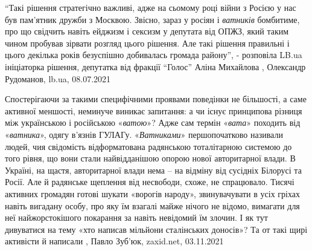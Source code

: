 \enquote{Такі рішення стратегічно важливі, адже на сьомому році війни з Росією у нас
був пам'ятник дружби з Москвою. Звісно, зараз у росіян і \emph{ватників} бомбитиме,
про що свідчить навіть ейджизм і сексизм у депутата від ОПЖЗ, який таким чином
пробував зірвати розгляд цього рішення. Але такі рішення правильні і цього
декілька років безуспішно добивалась громада району}, - розповіла LB.ua
ініціаторка рішення, депутатка від фракції \enquote{Голос} Аліна Михайлова
, 
Олександр Рудоманов, lb.ua, 08.07.2021

Спостерігаючи за такими специфічними проявами поведінки не більшості, а саме
активної меншості, неминуче виникає запитання: а чи існує принципова різниця
між українською і російською «\emph{ватою}»? Адже сам термін «\emph{вата}» походить від
«\emph{ватника}», одягу в'язнів ГУЛАГу. «\emph{Ватниками}» першопочатково називали людей, чия
свідомість відформатована радянською тоталітарною системою до того рівня, що
вони стали найвідданішою опорою нової авторитарної влади. В Україні, на щастя,
авторитарної влади нема – на відміну від сусідніх Білорусі та Росії. Але й
радянське щеплення від несвободи, схоже, не спрацювало. Тисячі активних
громадян готові шукати «ворогів народу», звинувачувати в усіх гріхах навіть
вигадану особу, про яку їм взагалі майже нічого не відомо, вимагати для неї
найжорстокішого покарання за навіть невідомий їм злочин. І як тут дивуватися на
тему «хто написав мільйони сталінських доносів»? Та от такі щирі активісти й
написали
, Павло Зуб'юк, zaxid.net, 03.11.2021

